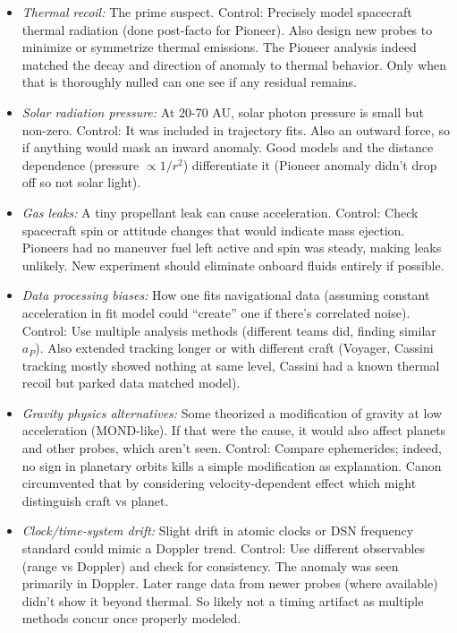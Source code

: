 \documentclass[11pt]{article}
\begin{document}
\begin{itemize}

\item 
\textit{Thermal recoil:} The prime suspect. Control: Precisely model spacecraft thermal radiation (done post-facto for Pioneer). Also design new probes to minimize or symmetrize thermal emissions. The Pioneer analysis indeed matched the decay and direction of anomaly to thermal behavior. Only when that is thoroughly nulled can one see if any residual remains.




\item 
\textit{Solar radiation pressure:} At 20-70 AU, solar photon pressure is small but non-zero. Control: It was included in trajectory fits. Also an outward force, so if anything would mask an inward anomaly. Good models and the distance dependence (pressure $\propto 1/r^2$) differentiate it (Pioneer anomaly didn’t drop off so not solar light).




\item 
\textit{Gas leaks:} A tiny propellant leak can cause acceleration. Control: Check spacecraft spin or attitude changes that would indicate mass ejection. Pioneers had no maneuver fuel left active and spin was steady, making leaks unlikely. New experiment should eliminate onboard fluids entirely if possible.




\item 
\textit{Data processing biases:} How one fits navigational data (assuming constant acceleration in fit model could “create” one if there’s correlated noise). Control: Use multiple analysis methods (different teams did, finding similar $a_P$). Also extended tracking longer or with different craft (Voyager, Cassini tracking mostly showed nothing at same level, Cassini had a known thermal recoil but parked data matched model).




\item 
\textit{Gravity physics alternatives:} Some theorized a modification of gravity at low acceleration (MOND-like). If that were the cause, it would also affect planets and other probes, which aren’t seen. Control: Compare ephemerides; indeed, no sign in planetary orbits kills a simple modification as explanation. Canon circumvented that by considering velocity-dependent effect which might distinguish craft vs planet.




\item 
\textit{Clock/time-system drift:} Slight drift in atomic clocks or DSN frequency standard could mimic a Doppler trend. Control: Use different observables (range vs Doppler) and check for consistency. The anomaly was seen primarily in Doppler. Later range data from newer probes (where available) didn’t show it beyond thermal. So likely not a timing artifact as multiple methods concur once properly modeled.




\end{itemize}
\end{document}
